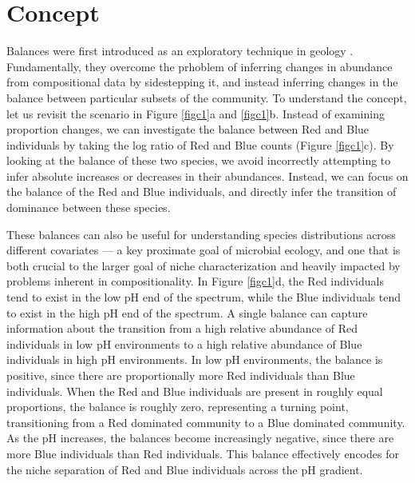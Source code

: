 \section{Concept}
Balances were first introduced as an exploratory technique in geology \cite{groups_of_parts} \cite{coda_dendrogram}. Fundamentally, they overcome the prhoblem of inferring changes in abundance from compositional data by sidestepping it, and instead inferring changes in the balance between particular subsets of the community. To understand the concept, let us revisit the scenario in Figure \ref{figc1}a and \ref{figc1}b.  Instead of examining proportion changes, we can investigate the balance between Red and Blue individuals by taking the log ratio of Red and Blue counts (Figure \ref{figc1}c).  By looking at the balance of these two species, we avoid incorrectly attempting to infer absolute increases or decreases in their abundances.  Instead, we can focus on the balance of the Red and Blue individuals, and directly infer the transition of dominance between these species.\par
These balances can also be useful for understanding species distributions across different covariates — a key proximate goal of microbial ecology, and one that is both crucial to the larger goal of niche characterization and heavily impacted by problems inherent in compositionality.  In Figure \ref{figc1}d, the Red individuals tend to exist in the low pH end of the spectrum, while the Blue individuals tend to exist in the high pH end of the spectrum.  A single balance can capture information about the transition from a high relative abundance of Red individuals in low pH environments to a high relative abundance of Blue individuals in high pH environments.  In low pH environments, the balance is positive, since there are proportionally more Red individuals than Blue individuals.  When the Red and Blue individuals are present in roughly equal proportions, the balance is roughly zero, representing a turning point, transitioning from a Red dominated community to a Blue dominated community.  As the pH increases, the balances become increasingly negative, since there are more Blue individuals than Red individuals. This balance effectively encodes for the niche separation of Red and Blue individuals across the pH gradient. \par

